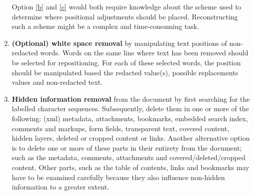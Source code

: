 \begin{enumerate}
        Option \ref{b} and \ref{c} would both require knowledge about the scheme used to determine where positional adjustments should be placed. Reconstructing such a scheme might be a complex and time-consuming task. 
    \item \textbf{(Optional) white space removal} by manipulating text positions of non-redacted words. Words on the same line where text has been removed should be selected for repositioning. For each of these selected words, the position should be manipulated based the redacted value(s), possible replacements values and non-redacted text.
    \item \textbf{Hidden information removal} from the document by first searching for the labelled character sequences. Subsequently, delete them in one or more of the following: (xml) metadata, attachments, bookmarks, embedded search index, comments and markups, form fields, transparent text, covered content, hidden layers, deleted or cropped content or links. Another alternative option is to delete one or more of these parts in their entirety from the document; such as the metadata, comments, attachments and covered/deleted/cropped content. Other parts, such as the table of contents, links and bookmarks may have to be examined carefully because they also influence non-hidden information to a greater extent. 

\end{enumerate}

